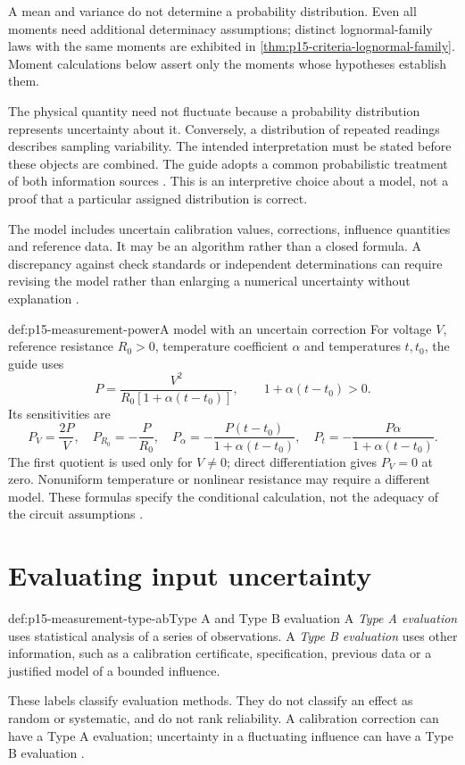 A mean and variance do not determine a probability distribution. Even all
moments need additional determinacy assumptions; distinct lognormal-family
laws with the same moments are exhibited in
\cref{thm:p15-criteria-lognormal-family}. Moment calculations below assert
only the moments whose hypotheses establish them.

The physical quantity need not fluctuate because a probability distribution
represents uncertainty about it. Conversely, a distribution of repeated
readings describes sampling variability. The intended interpretation must be
stated before these objects are combined. The guide adopts a common
probabilistic treatment of both information sources
\cite[4.1.1, 4.1.6, E.3]{JCGM1002008EMeasurement}.
This is an interpretive choice about a model, not a proof that a particular
assigned distribution is correct.

The model includes uncertain calibration values, corrections, influence
quantities and reference data. It may be an algorithm rather than a closed
formula. A discrepancy against check standards or independent determinations
can require revising the model rather than enlarging a numerical uncertainty
without explanation \cite[3.4.1--3.4.2, 4.1.2]{JCGM1002008EMeasurement}.

\begin{hbexample}{def:p15-measurement-power}{A model with an uncertain correction}
For voltage \(V\), reference resistance \(R_0>0\), temperature coefficient
\(\alpha\) and temperatures \(t,t_0\), the guide uses
\[
 P=\frac{V^2}{R_0[1+\alpha(t-t_0)]},
 \qquad 1+\alpha(t-t_0)>0.
\]
Its sensitivities are
\[
 P_V=\frac{2P}{V},\quad P_{R_0}=-\frac P{R_0},\quad
 P_\alpha=-\frac{P(t-t_0)}{1+\alpha(t-t_0)},\quad
 P_t=-\frac{P\alpha}{1+\alpha(t-t_0)}.
\]
The first quotient is used only for \(V\ne0\); direct differentiation gives
\(P_V=0\) at zero. Nonuniform temperature or nonlinear resistance may require
a different model. These formulas specify the conditional calculation, not
the adequacy of the circuit assumptions
\cite[4.1.1--4.1.2, 5.1.3]{JCGM1002008EMeasurement}.
\end{hbexample}

\section{Evaluating input uncertainty}
\label{sec:p15-measurement-input-evaluation}

\begin{hbdefinition}{def:p15-measurement-type-ab}{Type A and Type B evaluation}
A \emph{Type A evaluation} uses statistical analysis of a series of
observations. A \emph{Type B evaluation} uses other information, such as a
calibration certificate, specification, previous data or a justified model of
a bounded influence.

These labels classify evaluation methods. They do not classify an effect as
random or systematic, and do not rank reliability. A calibration correction
can have a Type A evaluation; uncertainty in a fluctuating influence can have
a Type B evaluation \cite[2.3, 3.3.3--3.3.5]{JCGM1002008EMeasurement}.
\end{hbdefinition}


